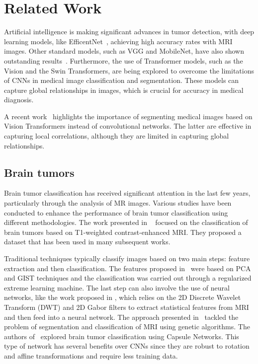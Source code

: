 \section{Related Work}
\label{se:relate_work}

Artificial intelligence is making significant advances in tumor detection, with deep learning models, like EfficentNet~\cite{medina2023high}, achieving high accuracy rates with MRI images. Other standard models, such as VGG and MobileNet, have also shown outstanding results~\cite{reyes2024performance}. Furthermore, the use of Transformer models, such as the Vision and the Swin Transformers, are being explored to overcome the limitations of CNNs in medical image classification and segmentation. These models can capture global relationships in images, which is crucial for accuracy in medical diagnosis.

A recent work~\cite{khan2023recentsurveyvisiontransformers} highlights the importance of segmenting medical images based on Vision Transformers instead of convolutional networks. The latter are effective in capturing local correlations, although they are limited in capturing global relationships. 

\subsection{Brain tumors}
Brain tumor classification has received significant attention in the last few years, particularly through the analysis of MR images. Various studies have been conducted to enhance the performance of brain tumor classification using different methodologies. The work presented in ~\cite{cheng2015enhanced} focused on the classification of brain tumors based on T1-weighted contrast-enhanced MRI. They proposed a dataset that has been used in many subsequent works.  

Traditional techniques typically classify images based on two main steps: feature extraction and then classification. The features proposed in~\cite{gumaei2019hybrid} were based on PCA and GIST techniques and the classification was carried out through a regularized extreme learning machine. The last step can also involve the use of neural networks, like the work proposed in \cite{ismael2018brain}, which relies on the 2D Discrete Wavelet Transform (DWT) and 2D Gabor filters to extract statistical features from MRI and then feed into a neural network. The approach presented in~\cite{bahadure2018comparative} tackled the problem of segmentation and classification of MRI using genetic algorithms. The authors of~\cite{afshar2018brain} explored brain tumor classification using Capsule Networks. This type of network has several benefits over CNNs since they are robust to rotation and affine transformations and require less training data.

